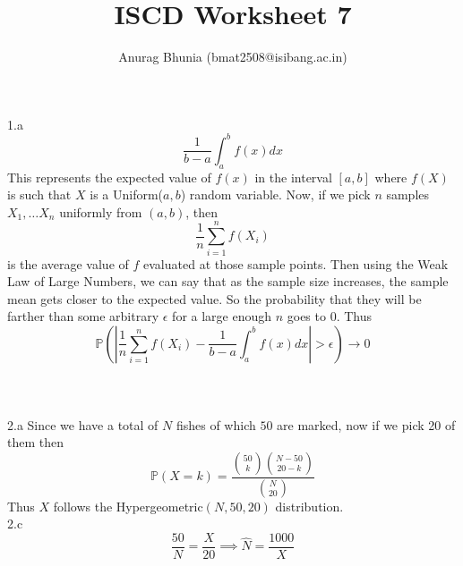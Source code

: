\documentclass{article}
\title{ISCD Worksheet 7}
\author{
\begin{tabular}{c}
Anurag Bhunia (bmat2508@isibang.ac.in)\\[0.6em]
\end{tabular}
}
\date{}
\begin{document}
\maketitle
1.a $$\frac{1}{b-a}\int_a^b f(x)dx$$
This represents the expected value of $f(x)$ in the interval $[a,b]$ where $f(X)$ is such that $X$ is a Uniform($a,b$) random variable. Now, if we pick $n$ samples $X_1,\dots X_n$ uniformly from $(a,b)$, then $$\frac{1}{n}\sum_{i=1}^{n}f(X_i)$$ is the average value of $f$ evaluated at those sample points. Then using the Weak Law of Large Numbers, we can say that as the sample size increases, the sample mean gets closer to the expected value. So the probability that they will be farther than some arbitrary $\epsilon$ for a large enough $n$ goes to 0.
Thus $$\mathbb{P}\left(|\frac{1}{n}\sum_{i=1}^{n}f(X_i)-\frac{1}{b-a}\int_a^b f(x)dx|>\epsilon\right)\to 0$$  
\\ \\ \\
2.a Since we have a total of $N$ fishes of which $50$ are marked, now if we pick 20 of them then 
$$\mathbb{P}(X=k)=\frac{\binom{50}{k}\binom{N-50}{20-k}}{\binom{N}{20}}$$
Thus $X$ follows the Hypergeometric$(N,50,20)$ distribution.
\\
2.c $$\frac{50}{N}=\frac{X}{20}\implies \hat{N}=\frac{1000}{X}$$
\end{document}
